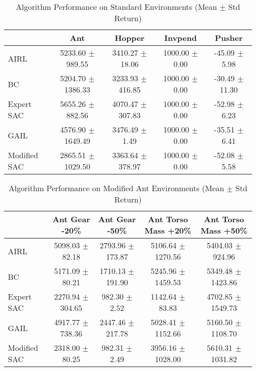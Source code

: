 
\begin{table}
\caption{Algorithm Performance on Standard Environments (Mean $\pm$ Std Return)}
\label{tab:perf_standard}
\begin{tabular}{lcccc}
\toprule
 & Ant & Hopper & Invpend & Pusher \\
\midrule
AIRL & 5233.60 $\pm$ 989.55 & 3410.27 $\pm$ 18.06 & 1000.00 $\pm$ 0.00 & -45.09 $\pm$ 5.98 \\
BC & 5204.70 $\pm$ 1386.33 & 3233.93 $\pm$ 416.85 & 1000.00 $\pm$ 0.00 & -30.49 $\pm$ 11.30 \\
Expert SAC & 5655.26 $\pm$ 882.56 & 4070.47 $\pm$ 307.83 & 1000.00 $\pm$ 0.00 & -52.98 $\pm$ 6.23 \\
GAIL & 4576.90 $\pm$ 1649.49 & 3476.49 $\pm$ 1.49 & 1000.00 $\pm$ 0.00 & -35.51 $\pm$ 6.41 \\
Modified SAC & 2865.51 $\pm$ 1029.50 & 3363.64 $\pm$ 378.97 & 1000.00 $\pm$ 0.00 & -52.08 $\pm$ 5.58 \\
\bottomrule
\end{tabular}
\end{table}




\begin{table}
\caption{Algorithm Performance on Modified Ant Environments (Mean $\pm$ Std Return)}
\label{tab:perf_mod_ant}
\begin{tabular}{lcccc}
\toprule
 & Ant Gear -20\% & Ant Gear -50\% & Ant Torso Mass +20\% & Ant Torso Mass +50\% \\
\midrule
AIRL & 5098.03 $\pm$ 82.18 & 2793.96 $\pm$ 173.87 & 5106.64 $\pm$ 1270.56 & 5404.03 $\pm$ 924.96 \\
BC & 5171.09 $\pm$ 80.21 & 1710.13 $\pm$ 191.90 & 5245.96 $\pm$ 1459.53 & 5349.48 $\pm$ 1423.86 \\
Expert SAC & 2270.94 $\pm$ 304.65 & 982.30 $\pm$ 2.52 & 1142.64 $\pm$ 83.83 & 4702.85 $\pm$ 1549.73 \\
GAIL & 4917.77 $\pm$ 738.36 & 2447.46 $\pm$ 217.78 & 5028.41 $\pm$ 1152.66 & 5160.50 $\pm$ 1108.70 \\
Modified SAC & 2318.00 $\pm$ 80.25 & 982.31 $\pm$ 2.49 & 3956.16 $\pm$ 1028.00 & 5610.31 $\pm$ 1031.82 \\
\bottomrule
\end{tabular}
\end{table}



